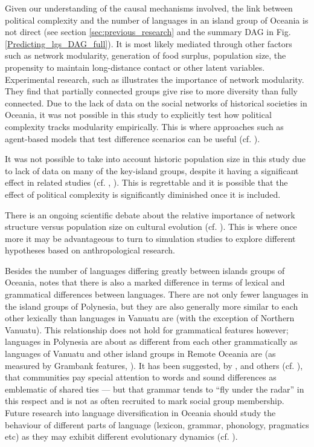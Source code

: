 \documentclass[unnumsec,webpdf,modern,medium]{oup-authoring-template}
\begin{document}
Given our understanding of the causal mechanisms involved, the link between political complexity and the number of languages in an island group of Oceania is not direct (see section \ref{sec:previous_research} and the summary DAG in Fig. \ref{Predicting_lgs_DAG_full}). It is most likely mediated through other factors such as network modularity, generation of food surplus, population size, the propensity to maintain long-distance contact or other latent variables. Experimental research, such as \citet{derex2016partial} illustrates the importance of network modularity. They find that partially connected groups give rise to more diversity than fully connected. Due to the lack of data on the social networks of historical societies in Oceania, it was not possible in this study to explicitly test how political complexity tracks modularity empirically. This is where approaches such as agent-based models that test difference scenarios can be useful (cf. \citet{reali2014paradox, mann2022cognition}).

It was not possible to take into account historic population size in this study due to lack of data on many of the key-island groups, despite it having a significant effect in related studies (cf. \citet{bromham_polynesian_sizes}, \citet{watts_2018}). This is regrettable and it is possible that the effect of political complexity is significantly diminished once it is included. 

There is an ongoing scientific debate about the relative importance of network structure versus population size on cultural evolution (cf. \citet{raviv2019larger, derex2016partial, milroy1992social, reali2014paradox}). This is where once more it may be advantageous to turn to simulation studies to explore different hypotheses based on anthropological research.

Besides the number of languages differing greatly between islands groups of Oceania, \citet[218-291]{skirgaard2020multilevel} notes that there is also a marked difference in terms of lexical and grammatical differences between languages. There are not only fewer languages in the island groups of Polynesia, but they are also generally more similar to each other lexically than languages in Vanuatu are (with the exception of Northern Vanuatu). This relationship does not hold for grammatical features however; languages in Polynesia are about as different from each other grammatically as languages of Vanuatu and other island groups in Remote Oceania are (as measured by Grambank features, \citep{grambank_release}). It has been suggested, by \citet{silverstein1981limits}, \citet{francois2011} and others (cf. \citet{mansfield2023dialect}), that communities pay special attention to words and sound differences as emblematic of shared ties --- but that grammar tends to ``fly under the radar'' in this respect and is not as often recruited to mark social group membership. Future research into language diversification in Oceania should study the behaviour of different parts of language (lexicon, grammar, phonology, pragmatics etc) as they may exhibit different evolutionary dynamics (cf. \citet{greenhilletal_2017}).
\end{document}
